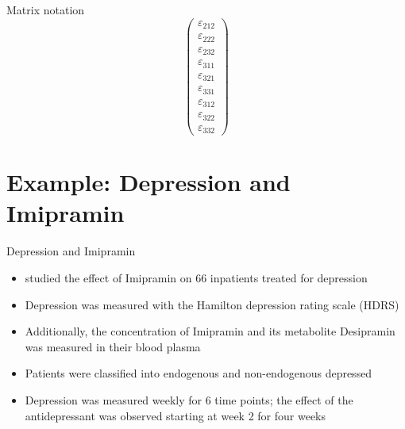 \documentclass[aspectratio=169]{beamer}
\begin{document}
\begin{frame}{Matrix notation}
\begin{equation*}
\begin{pmatrix}
    \varepsilon_{212} \\
    \varepsilon_{222} \\
    \varepsilon_{232} \\
    \varepsilon_{311} \\
    \varepsilon_{321} \\
    \varepsilon_{331} \\
    \varepsilon_{312} \\
    \varepsilon_{322} \\
    \varepsilon_{332}
  \end{pmatrix}
\end{equation*}
\end{frame}


% 
% 
% 


\section[Example]{Example: Depression and Imipramin}

\begin{frame}{Depression and Imipramin \citep{ReisbyGram77}}
  \begin{itemize}
    \item \citet{ReisbyGram77} studied the effect of Imipramin on 66
      inpatients treated for depression
    \item Depression was measured with the Hamilton depression rating scale
      (HDRS)
    \item Additionally, the concentration of Imipramin and its metabolite
      Desipramin was measured in their blood plasma
    \item Patients were classified into endogenous and non-endogenous
      depressed
    \item Depression was measured weekly for 6 time points; the effect of
      the antidepressant was observed starting at week 2 for four weeks
  \end{itemize}
\end{frame}
\end{document}
